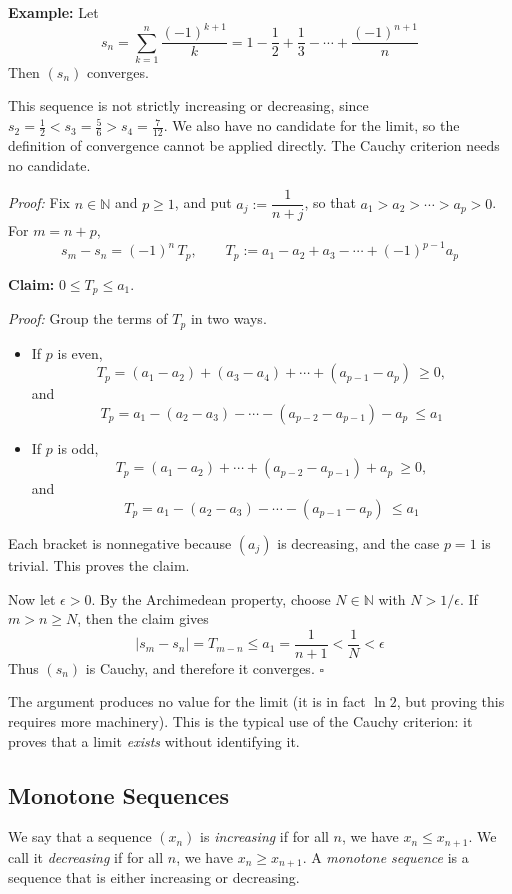 \documentclass[a4paper,11pt,abstracton]{scrartcl}
\newcommand{\NN}{\mathbb{N}}
\theoremstyle{dotlessP}
\theoremstyle{dotlessS}
\theoremstyle{remark}
\theoremstyle{definition}
\begin{document}
\begin{example_box}
\textbf{Example:} Let
\[
    s_n=\sum_{k=1}^{n}\frac{(-1)^{k+1}}{k}
    =1-\frac12+\frac13-\cdots+\frac{(-1)^{n+1}}{n}
\]
Then $(s_n)$ converges.

This sequence is not strictly increasing or decreasing, since $s_2=\tfrac12<s_3=\tfrac56>s_4=\tfrac7{12}$.
We also have no candidate for the limit, so the definition of convergence
cannot be applied directly. The Cauchy criterion needs no candidate.

\textit{Proof:}
Fix $n\in\NN$ and $p\ge1$, and put $a_j:=\dfrac{1}{n+j}$, so that
$a_1>a_2>\cdots>a_p>0$. For $m=n+p$,
\[
    s_m-s_n=(-1)^{n}\,T_p,
    \qquad
    T_p:=a_1-a_2+a_3-\cdots+(-1)^{p-1}a_p
\]

\begin{example_claim_box}
\textbf{Claim:} $0\le T_p\le a_1$.

\textit{Proof:} Group the terms of $T_p$ in two ways.
\begin{itemize}
    \item If $p$ is even,
    \[
        T_p=(a_1-a_2)+(a_3-a_4)+\cdots+(a_{p-1}-a_p)\ \ge 0,
    \]
    and
    \[
        T_p=a_1-(a_2-a_3)-\cdots-(a_{p-2}-a_{p-1})-a_p\ \le a_1
    \]
    \item If $p$ is odd,
    \[
        T_p=(a_1-a_2)+\cdots+(a_{p-2}-a_{p-1})+a_p\ \ge 0,
    \]
    and
    \[
        T_p=a_1-(a_2-a_3)-\cdots-(a_{p-1}-a_p)\ \le a_1
    \]
\end{itemize}
Each bracket is nonnegative because $(a_j)$ is decreasing, and the
case $p=1$ is trivial. This proves the claim.
\end{example_claim_box}

Now let $\epsilon>0$. By the Archimedean property, choose $N\in\NN$ with
$N>1/\epsilon$. If $m>n\ge N$, then the claim gives
\[
    |s_m-s_n|=T_{m-n}\le a_1=\frac{1}{n+1}<\frac1N<\epsilon
\]
Thus $(s_n)$ is Cauchy, and therefore it converges.
\hfill$\square$
\end{example_box}

\begin{remark_box}
The argument produces no value for the limit (it is in fact $\ln 2$, but
proving this requires more machinery). This is the typical use of the
Cauchy criterion: it proves that a limit \emph{exists} without
identifying it.
\end{remark_box}

\subsection{Monotone Sequences}
\begin{definition_box}
We say that a sequence $(x_n)$ is \emph{increasing} if for all $n$, we have $x_n \le x_{n+1}$. We call it \emph{decreasing} if for all $n$, we have $x_n \ge x_{n+1}$. A \emph{monotone sequence} is a sequence that is either increasing or decreasing.
\end{definition_box}
\end{document}
